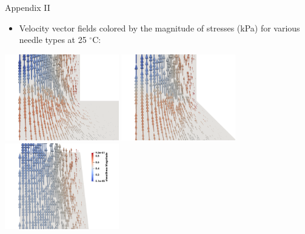 \begin{frame}{Appendix II}
\begin{itemize}
    \item Velocity vector fields colored by the magnitude of stresses (kPa) for various needle types at 25 $^{\circ}$C:
\end{itemize}
\vspace{3mm}
\centering
\includegraphics[trim = 0mm 0mm 0mm 0mm, clip, width=1.955in]{./images/90_stress_vector.png}
\includegraphics[trim = 0mm 0mm 0mm 0mm, clip, width=1.955in]{./images/45_stress_vector.png}
\includegraphics[trim = 0mm 0mm 0mm 0mm, clip, width=1.955in]{./images/tapered_stress_vector.png}
\end{frame}


